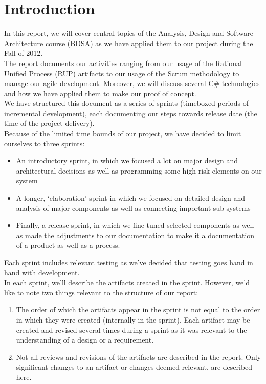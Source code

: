 \section{Introduction}
In this report, we will cover central topics of the Analysis, Design and Software Architecture course (BDSA) as we have applied them to our project during the Fall of 2012.\\
\newline
The report documents our activities ranging from our usage of the Rational Unified Process (RUP) artifacts \cite[p.~31]{OOAD} to our usage of the Scrum methodology to manage our agile development. Moreover, we will discuss several C\# technologies and how we have applied them to make our proof of concept.\\
\newline
We have structured this document as a series of sprints (timeboxed periods of incremental development), each documenting our steps towards release date (the time of the project delivery).\\
\newline
Because of the limited time bounds of our project, we have decided to limit ourselves to three sprints:\\
\begin{itemize}
\item An introductory sprint, in which we focused a lot on major design and architectural decisions as well as programming some high-risk elements on our system
\item A longer, ‘elaboration’ sprint in which we focused on detailed design and analysis of major components as well as connecting important sub-systems 
\item Finally, a release sprint, in which we fine tuned selected components as well as made the adjustments to our documentation to make it a documentation of a product as well as a process.
\end{itemize}
Each sprint includes relevant testing as we’ve decided that testing goes hand in hand with development.\\
\newline
In each sprint, we’ll describe the artifacts created in the sprint. However,
we’d like to note two things relevant to the structure of our report:\\
\begin{enumerate}
\item The order of which the artifacts appear in the sprint is not equal to the
  order in which they were created (internally in the sprint). Each artifact
  may be created and revised several times during a sprint as it was relevant
  to the understanding of a design or a requirement. 
\item Not all reviews and revisions of the artifacts are described in the
  report. Only significant changes to an artifact or changes deemed relevant,
  are described here.
\end{enumerate}
\newpage
